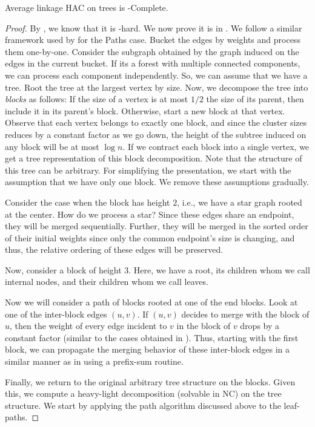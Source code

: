 \begin{theorem}\label{thm:avgtreeCCComplete}
    Average linkage HAC on trees is \CC-Complete.
\end{theorem}
\begin{proof}
    By , we know that it is \CC-hard. We now prove it is in \CC. We follow a similar framework used by  for the Paths case. Bucket the edges by weights and process them one-by-one. Consider the subgraph obtained by the graph induced on the edges in the current bucket. If its a forest with multiple connected components, we can process each component independently. So, we can assume that we have a tree. Root the tree at the largest vertex by size. Now, we decompose the tree into \emph{blocks} as follows: If the size of a vertex is at most $1/2$ the size of its parent, then include it in its parent's block. Otherwise, start a new block at that vertex. Observe that each vertex belongs to exactly one block, and since the cluster sizes reduces by a constant factor as we go down, the height of the subtree induced on any block will be at most $\log n$. If we contract each block into a single vertex, we get a tree representation of this block decomposition. Note that the structure of this tree can be arbitrary. For simplifying the presentation, we start with the assumption that we have only one block. We remove these assumptions gradually.

    Consider the case when the block has height $2$, i.e., we have a star graph rooted at the center. How do we process a star? Since these edges share an endpoint, they will be merged sequentially. Further, they will be merged in the sorted order of their initial weights since only the common endpoint's size is changing, and thus, the relative ordering of these edges will be preserved.

    Now, consider a block of height $3$. Here, we have a root, its children whom we call internal nodes, and their children whom we call leaves.

    Now we will consider a path of blocks rooted at one of the end blocks. Look at one of the inter-block edges $(u,v)$. If $(u,v)$ decides to merge with the block of $u$, then the weight of every edge incident to $v$ in the block of $v$ drops by a constant factor (similar to the cases obtained in ). Thus, starting with the first block, we can propagate the merging behavior of these inter-block edges in a similar manner as in  using a prefix-sum routine. 

    Finally, we return to the original arbitrary tree structure on the blocks. Given this, we compute a heavy-light decomposition (solvable in NC) on the tree structure. We start by applying the path algorithm discussed above to the leaf-paths.

\end{proof}
